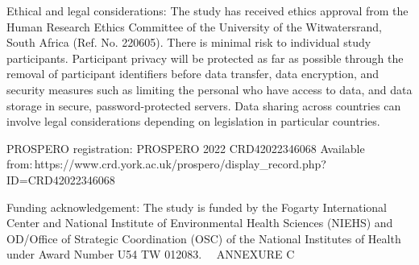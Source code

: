 \documentclass[12pt,letterpaper]{article}
\begin{document}
Ethical and legal considerations: The study has received ethics approval from the Human Research Ethics Committee of the University of the Witwatersrand, South Africa (Ref. No. 220605). There is minimal risk to individual study participants. Participant privacy will be protected as far as possible through the removal of participant identifiers before data transfer, data encryption, and security measures such as limiting the personal who have access to data, and data storage in secure, password-protected servers. Data sharing across countries can involve legal considerations depending on legislation in particular countries.

PROSPERO registration: PROSPERO 2022 CRD42022346068 Available from: https://www.crd.york.ac.uk/prospero/display\_record.php?ID=CRD42022346068

Funding acknowledgement: The study is funded by the Fogarty International Center and National Institute of Environmental Health Sciences (NIEHS) and OD/Office of Strategic Coordination (OSC) of the National Institutes of Health under Award Number U54 TW 012083.  ANNEXURE C
\end{document}
